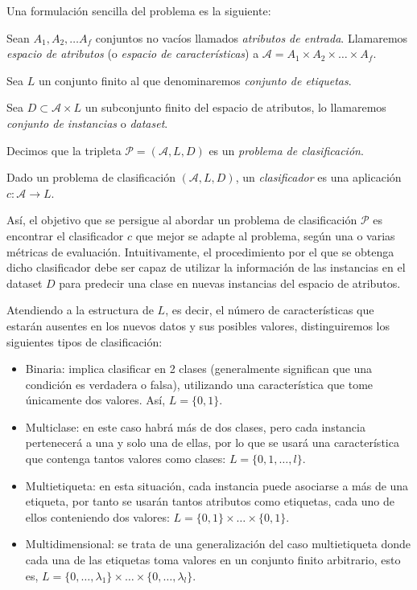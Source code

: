 Una formulación sencilla del problema es la siguiente:

Sean \(A_1, A_2, \dots A_f\) conjuntos no vacíos llamados
\emph{atributos de entrada}. Llamaremos \emph{espacio de atributos} (o
\emph{espacio de características}) a
\(\mathcal A=A_1\times A_2\times\dots\times A_f\).

Sea $L$ un conjunto finito al que denominaremos \emph{conjunto de etiquetas}.

Sea \(D\subset \mathcal A\times L\) un subconjunto finito del espacio de
atributos, lo llamaremos \emph{conjunto de instancias} o \emph{dataset}.

Decimos que la tripleta \(\mathcal P=\left(\mathcal A, L, D\right)\) es
un \emph{problema de clasificación}. 

Dado un problema de clasificación \(\left(\mathcal A, L, D\right)\), un
\emph{clasificador} es una aplicación \(c:\mathcal A\rightarrow L\).

Así, el objetivo que se persigue al abordar un problema de clasificación
\(\mathcal P\) es encontrar el clasificador \(c\) que mejor se adapte al
problema, según una o varias métricas de evaluación. Intuitivamente, el
procedimiento por el que se obtenga dicho clasificador debe ser capaz de
utilizar la información de las instancias en el dataset \(D\) para
predecir una clase en nuevas instancias del espacio de atributos.

Atendiendo a la estructura de $L$, es decir, el número de características que estarán ausentes en los nuevos datos y sus posibles valores, distinguiremos los siguientes tipos de clasificación:
\begin{itemize}
\item Binaria: implica clasificar en 2 clases (generalmente significan que una condición es verdadera o falsa), utilizando una característica que tome únicamente dos valores. Así, $L = \{0,1\}$.
\item Multiclase: en este caso habrá más de dos clases, pero cada instancia pertenecerá a una y solo una de ellas, por lo que se usará una característica que contenga tantos valores como clases: $L=\{0, 1,\dots, l\}$.
\item Multietiqueta: en esta situación, cada instancia puede asociarse a más de una etiqueta, por tanto se usarán tantos atributos como etiquetas, cada uno de ellos conteniendo dos valores: $L=\{0,1\}\times\dots\times\{0,1\}$.
\item Multidimensional: se trata de una generalización del caso multietiqueta donde cada una de las etiquetas toma valores en un conjunto finito arbitrario, esto es, $L=\{0,\dots, \lambda_1\}\times\dots\times\{0,\dots, \lambda_l\}$.
\end{itemize}


